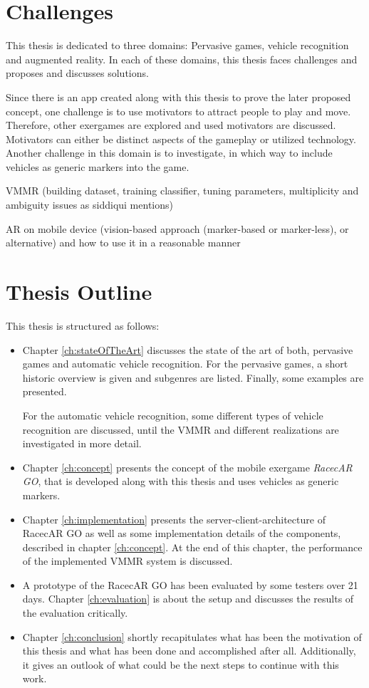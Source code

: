 \section{Challenges}
This thesis is dedicated to three domains: Pervasive games, vehicle recognition and augmented reality. In each of these domains, this thesis faces challenges and proposes and discusses solutions.

Since there is an app created along with this thesis to prove the later proposed concept, one challenge is to use motivators to attract people to play and move. Therefore, other exergames are explored and used motivators are discussed. Motivators can either be distinct aspects of the gameplay or utilized technology. Another challenge in this domain is to investigate, in which way to include vehicles as generic markers into the game.

VMMR (building dataset, training classifier, tuning parameters, multiplicity and ambiguity issues as siddiqui mentions)
 
AR on mobile device (vision-based approach (marker-based or marker-less), or alternative) and how to use it in a reasonable manner

\section{Thesis Outline}
This thesis is structured as follows:
\begin{itemize}
  \item Chapter \ref{ch:stateOfTheArt} discusses the state of the art of both, pervasive games and automatic vehicle recognition. For the pervasive games, a short historic overview is given and subgenres are listed. Finally, some examples are presented.
  
  For the automatic vehicle recognition, some different types of vehicle recognition are discussed, until the VMMR and different realizations are investigated in more detail.
  \item Chapter \ref{ch:concept} presents the concept of the mobile exergame \emph{RacecAR GO}, that is developed along with this thesis and uses vehicles as generic markers.
  \item Chapter \ref{ch:implementation} presents the server-client-architecture of RacecAR GO as well as some implementation details of the components, described in chapter \ref{ch:concept}. At the end of this chapter, the performance of the implemented VMMR system is discussed.
  \item A prototype of the RacecAR GO has been evaluated by some testers over 21 days. Chapter \ref{ch:evaluation} is about the setup and discusses the results of the evaluation critically.
  \item Chapter \ref{ch:conclusion} shortly recapitulates what has been the motivation of this thesis and what has been done and accomplished after all. Additionally, it gives an outlook of what could be the next steps to continue with this work.
\end{itemize}






